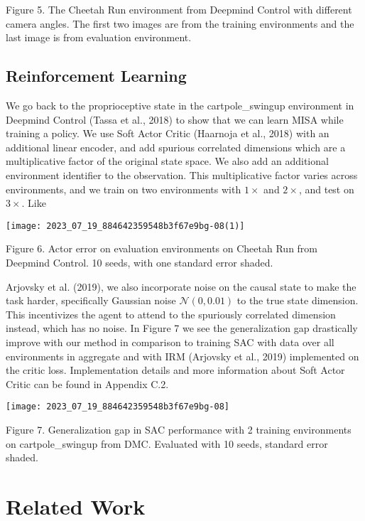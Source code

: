 \documentclass[10pt]{article}
\begin{document}
Figure 5. The Cheetah Run environment from Deepmind Control with different camera angles. The first two images are from the training environments and the last image is from evaluation environment.

\subsection{Reinforcement Learning}
We go back to the proprioceptive state in the cartpole\_swingup environment in Deepmind Control (Tassa et al., 2018) to show that we can learn MISA while training a policy. We use Soft Actor Critic (Haarnoja et al., 2018) with an additional linear encoder, and add spurious correlated dimensions which are a multiplicative factor of the original state space. We also add an additional environment identifier to the observation. This multiplicative factor varies across environments, and we train on two environments with $1 \times$ and $2 \times$, and test on $3 \times$. Like

\begin{center}
\texttt{[image: 2023\_07\_19\_884642359548b3f67e9bg-08(1)]}
\end{center}

Figure 6. Actor error on evaluation environments on Cheetah Run from Deepmind Control. 10 seeds, with one standard error shaded.

Arjovsky et al. (2019), we also incorporate noise on the causal state to make the task harder, specifically Gaussian noise $\mathcal{N}(0,0.01)$ to the true state dimension. This incentivizes the agent to attend to the spuriously correlated dimension instead, which has no noise. In Figure 7 we see the generalization gap drastically improve with our method in comparison to training SAC with data over all environments in aggregate and with IRM (Arjovsky et al., 2019) implemented on the critic loss. Implementation details and more information about Soft Actor Critic can be found in Appendix C.2.

\begin{center}
\texttt{[image: 2023\_07\_19\_884642359548b3f67e9bg-08]}
\end{center}

Figure 7. Generalization gap in SAC performance with 2 training environments on cartpole\_swingup from DMC. Evaluated with 10 seeds, standard error shaded.

\section{Related Work}
\end{document}
